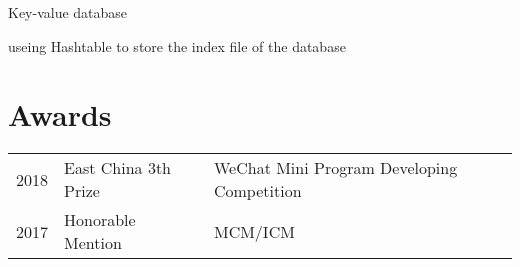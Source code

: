 \documentclass[]{deedy-resume-openfont}
\begin{document}
\begin{minipage}[t]{0.68\textwidth}
\begin{tightemize}
    \item Key-value database 
    \item useing Hashtable to store the index file of the database
\end{tightemize}
\sectionsep




\section{Awards} 
\begin{tabular}{rll}
2018         & East China 3th Prize  & WeChat Mini Program Developing Competition \\
2017         & Honorable Mention  & MCM/ICM \\
\end{tabular}
\sectionsep


% 
% 

\end{minipage} 
\end{document}
